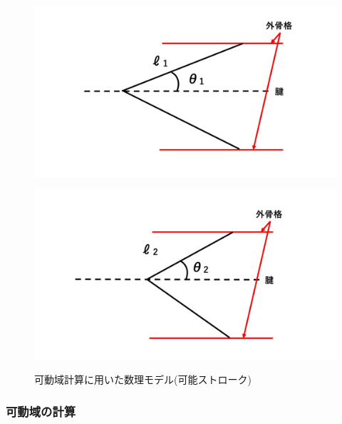 \begin{figure}[ht]
  \begin{minipage}{0.49\hsize}
    \centering  
    \includegraphics[scale=0.23]{image/model_2_open.jpg}
    \label{fig:model_2_before}
  \end{minipage}
  \begin{minipage}{0.49\hsize}
    \centering
    \includegraphics[scale=0.23]{image/model_2_close.jpg}
    \label{fig:model_2_after}
  \end{minipage}
  \caption{可動域計算に用いた数理モデル(可能ストローク)}
  \label{fig:model_2}
\end{figure}
\subsubsection{可動域の計算}







